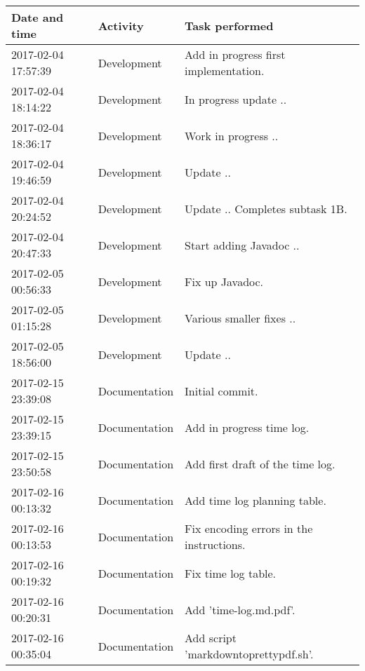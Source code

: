 \begin{table}[]
  \centering
  \begin{tabular}{@{}l|l|l}
    \toprule


    Date and time       & Activity      & Task performed                                     \\ \midrule
    2017-02-04 17:57:39 & Development   & Add in progress first implementation.              \\
    2017-02-04 18:14:22 & Development   & In progress update ..                              \\
    2017-02-04 18:36:17 & Development   & Work in progress ..                                \\
    2017-02-04 19:46:59 & Development   & Update ..                                          \\
    2017-02-04 20:24:52 & Development   & Update .. Completes subtask 1B.                    \\
    2017-02-04 20:47:33 & Development   & Start adding Javadoc ..                            \\
    2017-02-05 00:56:33 & Development   & Fix up Javadoc.                                    \\
    2017-02-05 01:15:28 & Development   & Various smaller fixes ..                           \\
    2017-02-05 18:56:00 & Development   & Update ..                                          \\
    2017-02-15 23:39:08 & Documentation & Initial commit.                                    \\
    2017-02-15 23:39:15 & Documentation & Add in progress time log.                          \\
    2017-02-15 23:50:58 & Documentation & Add first draft of the time log.                   \\
    2017-02-16 00:13:32 & Documentation & Add time log planning table.                       \\
    2017-02-16 00:13:53 & Documentation & Fix encoding errors in the instructions.           \\
    2017-02-16 00:19:32 & Documentation & Fix time log table.                                \\
    2017-02-16 00:20:31 & Documentation & Add 'time-log.md.pdf'.                             \\
    2017-02-16 00:35:04 & Documentation & Add script 'markdowntoprettypdf.sh'.               \\

\end{tabular}
\end{table}
